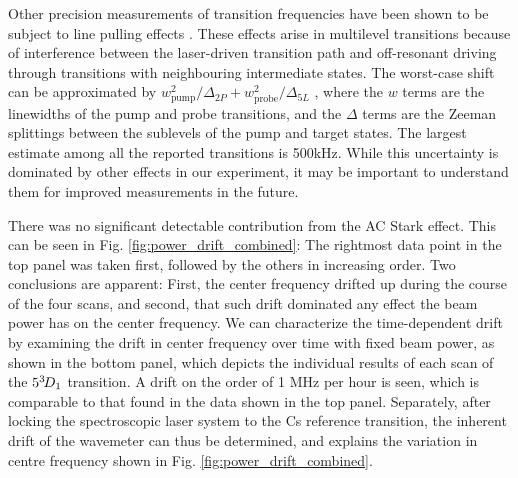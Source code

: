 	Other precision measurements of transition frequencies have been shown to be subject to line pulling effects \cite{Marsman15,Marsman15PRA}.
	These effects arise in multilevel transitions because of interference between the laser-driven transition path and off-resonant driving through transitions with neighbouring intermediate states.
	The worst-case shift can be approximated by $w_{\text{pump}}^2/\Delta_{2P} + w_{\text{probe}}^2/\Delta_{5L}$ \cite{Marsman15,Marsman15PRA}, where the $w$ terms are the linewidths of the pump and probe transitions, and the $\Delta$ terms are the Zeeman splittings between the sublevels of the pump and target states.
	The largest estimate among all the reported transitions is 500kHz.
	While this uncertainty is dominated by other effects in our experiment, it may be important to understand them for improved measurements in the future.

	There was no significant detectable contribution from the AC Stark effect.
	This can be seen in Fig.	\ref{fig:power_drift_combined}: The rightmost data point in the top panel was taken first, followed by the others in increasing order. Two conclusions are apparent: First, the center frequency drifted up during the course of the four scans, and second, that such drift dominated any effect the beam power has on the center frequency. We can characterize the time-dependent drift by examining the drift in center frequency over time with fixed beam power, as shown in the bottom panel, which depicts the individual results of each scan of the $5^{3\!} D_1$ transition. A drift on the order of 1 MHz per hour is seen, which is comparable to that found in the data shown in the top panel. Separately, after locking the spectroscopic laser system to the Cs reference transition, the inherent drift of the wavemeter can thus be determined, and explains the variation in centre frequency shown in Fig.	\ref{fig:power_drift_combined}.


	



